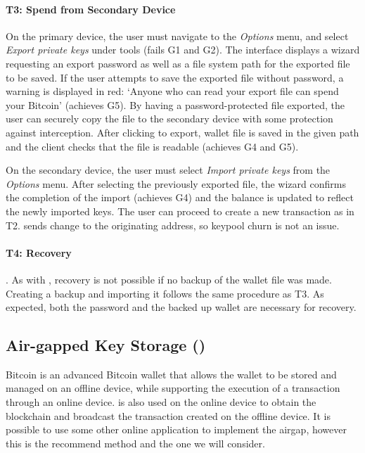 \paragraph{T3: Spend from Secondary Device} On the primary device, the user must navigate to the \emph{Options} menu, and select \emph{Export private keys} under tools (fails G1 and G2). The interface displays a wizard requesting an export password as well as a file system path for the exported file to be saved. 
If the user attempts to save the exported file without password, a warning is displayed in red: `Anyone who can read your export file can spend your Bitcoin' (achieves G5). By having a password-protected file exported, the user can securely copy the file to the secondary device with some protection against interception. After clicking to export, wallet file is saved in the given path and the client checks that the file is readable (achieves G4 and G5). 

On the secondary device, the user must select \emph{Import private keys} from the \emph{Options} menu. After selecting the previously exported file, the wizard confirms the completion of the import (achieves G4) and the balance is updated to reflect the newly imported keys. The user can proceed to create a new transaction as in T2. \multibit sends change to the originating address, so keypool churn is not an issue.


\paragraph{T4: Recovery}.
As with \Bitcoinclient, recovery is not possible if no backup of the wallet file was made. Creating a backup and importing it follows the same procedure as T3. As expected, both the password and the backed up wallet are necessary for recovery.

\subsection{Air-gapped Key Storage (\armory)}
\label{air gap}
Bitcoin \armory is an advanced Bitcoin wallet that allows the wallet to be stored and managed on an offline device, while supporting the execution of a transaction through an online device. \armory is also used on the online device to obtain the blockchain and broadcast the transaction created on the offline device. It is possible to use some other online application to implement the airgap, however this is the recommend method and the one we will consider.


